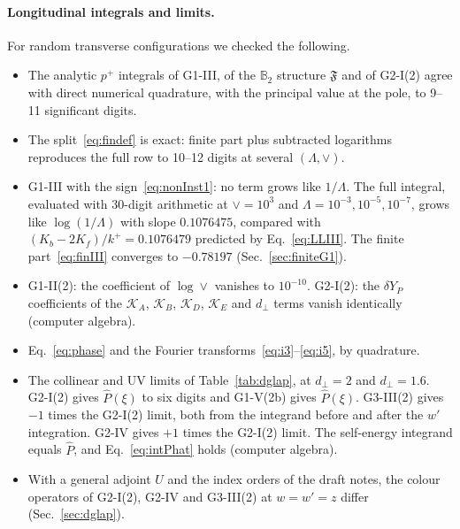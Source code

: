 \documentclass[aps,prd,onecolumn,superscriptaddress,nofootinbib,floatfix,longbibliography,11pt]{revtex4-2}
\numberwithin{equation}{section}
\newcommand{\KK}{\mathcal{K}}
\def\mf#1{\mathbb{#1}}
\newcommand{\Phat}{\hat P}
\begin{document}
\paragraph*{Longitudinal integrals and limits.} For random transverse configurations we checked the following.
\begin{itemize}
\item The analytic $p^+$ integrals of G1-III, of the $\mf B_2$ structure $\mathfrak F$ and of G2-I(2) agree with direct numerical quadrature, with the principal value at the pole, to 9--11 significant digits.
\item The split~\eqref{eq:findef} is exact: finite part plus subtracted logarithms reproduces the full row to 10--12 digits at several $(\Lambda,\vee)$.
\item G1-III with the sign~\eqref{eq:nonInst1}: no term grows like $1/\Lambda$. The full integral, evaluated with 30-digit arithmetic at $\vee=10^3$ and $\Lambda=10^{-3},10^{-5},10^{-7}$, grows like $\log(1/\Lambda)$ with slope $0.1076475$, compared with $(K_b-2K_f)/k^+=0.1076479$ predicted by Eq.~\eqref{eq:LLIII}. The finite part~\eqref{eq:finIII} converges to $-0.78197$ (Sec.~\ref{sec:finiteG1}).
\item G1-II(2): the coefficient of $\log\vee$ vanishes to $10^{-10}$. G2-I(2): the $\delta Y_P$ coefficients of the $\KK_A$, $\KK_B$, $\KK_D$, $\KK_E$ and $d_\perp$ terms vanish identically (computer algebra).
\item Eq.~\eqref{eq:phase} and the Fourier transforms~\eqref{eq:i3}--\eqref{eq:i5}, by quadrature.
\item The collinear and UV limits of Table~\ref{tab:dglap}, at $d_\perp=2$ and $d_\perp=1.6$. G2-I(2) gives $\Phat(\xi)$ to six digits and G1-V(2b) gives $\Phat(\xi)$. G3-III(2) gives $-1$ times the G2-I(2) limit, both from the integrand before and after the $w'$ integration. G2-IV gives $+1$ times the G2-I(2) limit. The self-energy integrand equals $\Phat$, and Eq.~\eqref{eq:intPhat} holds (computer algebra).
\item With a general adjoint $U$ and the index orders of the draft notes, the colour operators of G2-I(2), G2-IV and G3-III(2) at $w=w'=z$ differ (Sec.~\ref{sec:dglap}).
\end{itemize}
\end{document}
